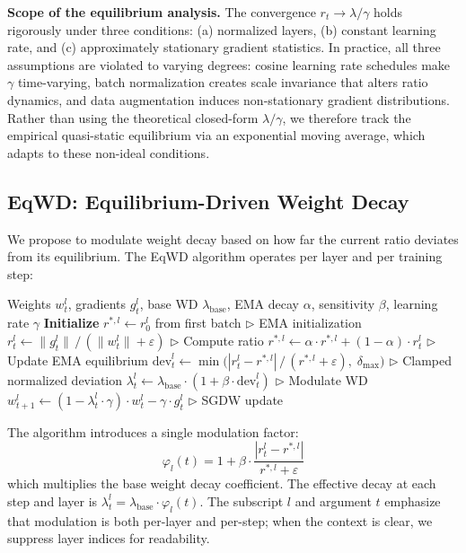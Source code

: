 \documentclass{article}
\begin{document}
\textbf{Scope of the equilibrium analysis.} The convergence
$r_t \to \lambda / \gamma$ holds rigorously under three conditions:
(a) normalized layers, (b) constant learning rate, and (c) approximately
stationary gradient statistics. In practice, all three assumptions are
violated to varying degrees: cosine learning rate schedules make
$\gamma$ time-varying, batch normalization creates scale invariance
that alters ratio dynamics, and data augmentation induces non-stationary
gradient distributions. Rather than using the theoretical closed-form
$\lambda/\gamma$, we therefore track the empirical quasi-static
equilibrium via an exponential moving average, which adapts to these
non-ideal conditions.

\subsection{EqWD: Equilibrium-Driven Weight Decay}
\label{sec:eqwd}

We propose to modulate weight decay based on how far the current ratio
deviates from its equilibrium. The EqWD algorithm operates per layer and
per training step:

\begin{algorithm}[t]
\caption{EqWD: Equilibrium-Driven Weight Decay}
\label{alg:eqwd}
\begin{algorithmic}[1]
\REQUIRE Weights $w_t^l$, gradients $g_t^l$, base WD $\lambda_{\text{base}}$, EMA decay $\alpha$, sensitivity $\beta$, learning rate $\gamma$
\STATE \textbf{Initialize} $r^{*,l} \leftarrow r_0^l$ from first batch \hfill $\triangleright$ EMA initialization
\STATE $r_t^l \leftarrow \|g_t^l\| \,/\, (\|w_t^l\| + \varepsilon)$ \hfill $\triangleright$ Compute ratio
\STATE $r^{*,l} \leftarrow \alpha \cdot r^{*,l} + (1 - \alpha) \cdot r_t^l$ \hfill $\triangleright$ Update EMA equilibrium
\STATE $\text{dev}_t^l \leftarrow \min\bigl(|r_t^l - r^{*,l}| \,/\, (r^{*,l} + \varepsilon),\; \delta_{\max}\bigr)$ \hfill $\triangleright$ Clamped normalized deviation
\STATE $\lambda_t^l \leftarrow \lambda_{\text{base}} \cdot (1 + \beta \cdot \text{dev}_t^l)$ \hfill $\triangleright$ Modulate WD
\STATE $w_{t+1}^l \leftarrow (1 - \lambda_t^l \cdot \gamma) \cdot w_t^l - \gamma \cdot g_t^l$ \hfill $\triangleright$ SGDW update
\end{algorithmic}
\end{algorithm}

The algorithm introduces a single modulation factor:
\[\varphi_l(t) = 1 + \beta \cdot \frac{|r_t^l - r^{*,l}|}{r^{*,l} + \varepsilon}\]
which multiplies the base weight decay coefficient. The effective decay
at each step and layer is
$\lambda_t^l = \lambda_{\text{base}} \cdot \varphi_l(t)$. The
subscript $l$ and argument $t$ emphasize that modulation is both
per-layer and per-step; when the context is clear, we suppress layer
indices for readability.
\end{document}
